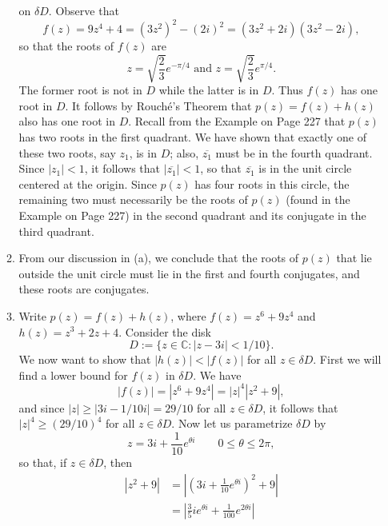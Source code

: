 \documentclass[9pt]{article}
\newcommand{\C}{\mathbb{C}}
\begin{document}
\begin{enumerate}
\begin{enumerate}
               on $\delta D$. Observe that
               $$f(z) = 9z^4 + 4 = (3z^2)^2 - (2i)^2 = (3z^2 + 2i)(3z^2 - 2i),$$
               so that the roots of $f(z)$ are
               $$z = \sqrt{\frac{2}{3}}e^{-\pi/4} \text{ and }
                 z = \sqrt{\frac{2}{3}}e^{\pi/4}.$$
               The former root is not in $D$ while the latter is in $D$. Thus
               $f(z)$ has one root in $D$. It follows by Rouch\'{e}'s Theorem
               that $p(z) = f(z) + h(z)$ also has one root in $D$. Recall from
               the Example on Page 227 that $p(z)$ has two roots in the first
               quadrant. We have shown that exactly one of these two roots, say
               $z_1$, is in $D$; also, $\overline{z_1}$ must be in the fourth
               quadrant. Since $|z_1| < 1$, it follows that
               $|\overline{z_1}| < 1$, so that $\overline{z_1}$ is in the unit
               circle centered at the origin. Since $p(z)$ has four roots in
               this circle, the remaining two must necessarily be the roots of
               $p(z)$ (found in the Example on Page 227) in the second quadrant 
               and its conjugate in the third quadrant.
         \item From our discussion in (a), we conclude that the roots of $p(z)$
               that lie outside the unit circle must lie in the first and fourth
               conjugates, and these roots are conjugates.
         \item Write $p(z) = f(z) + h(z)$, where $f(z) = z^6 + 9z^4$ and
               $h(z) = z^3 + 2z + 4$. Consider the disk
               $$D := \{z \in \C : |z - 3i| < 1/10\}.$$
               We now want to show that $|h(z)| < |f(z)|$ for all
               $z \in \delta D$. First we will find a lower bound for $f(z)$ in
               $\delta D$. We have
               $$|f(z)| = |z^6 + 9z^4| = |z|^4|z^2 + 9|,$$
               and since $|z| \ge |3i - 1/10i| = 29/10$ for all
               $z \in \delta D$, it follows that $|z|^4 \ge (29/10)^4$ for all
               $z \in \delta D$. Now let us parametrize $\delta D$ by
               $$z = 3i + \frac{1}{10}e^{\theta i} \qquad
                 0 \le \theta \le 2\pi,$$
               so that, if $z \in \delta D$, then
               \begin{align*}
                  |z^2 + 9| &= \left|
                     \left(3i + \frac{1}{10}e^{\theta i}\right)^2 + 9\right| \\
                     &= \left|\frac{3}{5}ie^{\theta i} +
                        \frac{1}{100}e^{2\theta i}\right| \\

\end{align*}
\end{enumerate}
\end{enumerate}
\end{document}
